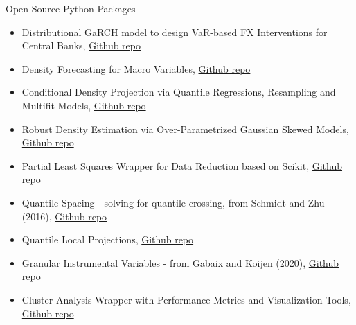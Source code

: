 \documentclass[usegeometry, 10pt, a4paper]{cv} %
\begin{document}
\begin{rubriquetableau}[0.95\textwidth]{Open Source Python Packages}\\
  \vspace{-0.8cm}
  
\begin{itemize}
\item Distributional GaRCH model to design VaR-based FX Interventions for Central Banks, \href{https://github.com/romainlafarguette/varfxi}{Github repo} 
\item Density Forecasting for Macro Variables, \href{https://github.com/IMFGAR/GaR}{Github repo}
\item Conditional Density Projection via Quantile Regressions, Resampling and Multifit Models, \href{https://github.com/romainlafarguette/gar}{Github repo}
\item Robust Density Estimation via Over-Parametrized Gaussian Skewed Models, \href{https://github.com/romainlafarguette/robustdensity}{Github repo}
\item Partial Least Squares Wrapper for Data Reduction based on Scikit, \href{https://github.com/romainlafarguette/plswrapper}{Github repo}
\item Quantile Spacing - solving for quantile crossing, from Schmidt and Zhu (2016), \href{https://github.com/romainlafarguette/quantilespacing}{Github repo}
\item Quantile Local Projections, \href{https://github.com/romainlafarguette/quantileproj}{Github repo}
\item Granular Instrumental Variables - from Gabaix and Koijen (2020), \href{https://github.com/romainlafarguette/granulariv}{Github repo}
\item Cluster Analysis Wrapper with Performance Metrics and Visualization Tools, \href{https://github.com/romainlafarguette/clusterwrapper}{Github repo}
\end{itemize}  

\end{rubriquetableau}

\end{document}
